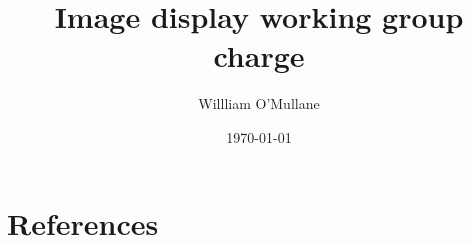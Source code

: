\documentclass[DM,lsstdraft,toc]{lsstdoc}
\title{	Image display working group charge}
\author{%
Willliam O'Mullane
}
\date{\today}
\begin{document}
\maketitle





\appendix
\section{References} \label{sec:bib}


\printglossaries
\end{document}
